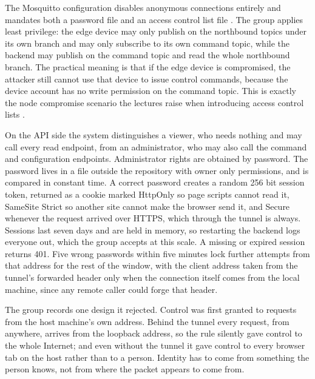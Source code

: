 The Mosquitto configuration disables anonymous connections entirely and mandates both a password file and an access control list file \cite{mosquitto}. The group applies least privilege: the edge device may only publish on the northbound topics under its own branch and may only subscribe to its own command topic, while the backend may publish on the command topic and read the whole northbound branch. The practical meaning is that if the edge device is compromised, the attacker still cannot use that device to issue control commands, because the device account has no write permission on the command topic. This is exactly the node compromise scenario the lectures raise when introducing access control lists \cite{slide03}.

On the API side the system distinguishes a viewer, who needs nothing and may call every read endpoint, from an administrator, who may also call the command and configuration endpoints. Administrator rights are obtained by password. The password lives in a file outside the repository with owner only permissions, and is compared in constant time. A correct password creates a random 256 bit session token, returned as a cookie marked HttpOnly so page scripts cannot read it, SameSite Strict so another site cannot make the browser send it, and Secure whenever the request arrived over HTTPS, which through the tunnel is always. Sessions last seven days and are held in memory, so restarting the backend logs everyone out, which the group accepts at this scale. A missing or expired session returns 401. Five wrong passwords within five minutes lock further attempts from that address for the rest of the window, with the client address taken from the tunnel's forwarded header only when the connection itself comes from the local machine, since any remote caller could forge that header.

The group records one design it rejected. Control was first granted to requests from the host machine's own address. Behind the tunnel every request, from anywhere, arrives from the loopback address, so the rule silently gave control to the whole Internet; and even without the tunnel it gave control to every browser tab on the host rather than to a person. Identity has to come from something the person knows, not from where the packet appears to come from.

